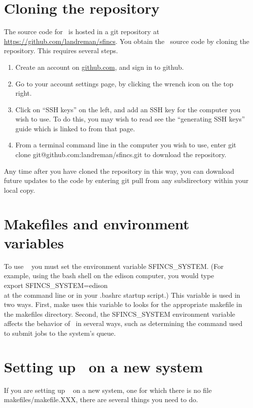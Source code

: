 \section{Cloning the repository}

The source code for \sfincs~is hosted in a {\ttfamily git} repository at
\url{https://github.com/landreman/sfincs}.
You obtain the \sfincs~source code by cloning the repository. This requires several steps.

\begin{enumerate}
\item Create an account on \url{github.com}, and sign in to {\ttfamily github}.
\item Go to your account settings page, by clicking the wrench icon on the top right.
\item Click on ``SSH keys'' on the left, and add an SSH key for the computer you wish to use. To do this, you may wish to read see the ``generating SSH keys'' guide which is linked to from that page.
\item From a terminal command line in the computer you wish to use, enter {\ttfamily git clone git@github.com:landreman/sfincs.git} to download the repository.
\end{enumerate}

Any time after you have cloned the repository in this way, you can download future updates to the code by entering {\ttfamily git pull} from any subdirectory within your local copy.

\section{Makefiles and environment variables}

To use \sfincs~ you must set the environment variable {\ttfamily SFINCS\_SYSTEM}.
(For example, using the {\ttfamily bash} shell on the {\ttfamily edison}
computer, you would type\\
{\ttfamily export SFINCS\_SYSTEM=edison}\\
 at the command line
or in your {\ttfamily .bashrc} startup script.)
This variable is used in two ways. 
First, {\ttfamily make} uses this variable to looks for the 
appropriate makefile in the {\ttfamily makefiles} directory.  Second, the {\ttfamily SFINCS\_SYSTEM} environment
variable affects the behavior of
\sfincsScan~in several ways, such as determining the command used to submit jobs to the system's queue.

\section{Setting up \sfincs~on a new system}
If you are setting up \sfincs~ on a new system, one for which there is no file {\ttfamily makefiles/makefile.XXX},
there are several things you need to do.

